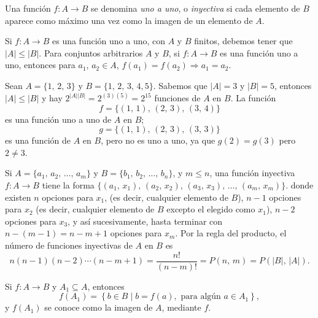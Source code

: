 \begin{definicion}{}{}
     Una función $f: A \longrightarrow B$ se denomina \textit{uno a uno}, o \textit{inyectiva} si cada elemento de $B$ aparece como máximo una vez como la imagen de un elemento de $A$.
 \end{definicion}

 \begin{BOX}
     Si $f: A \longrightarrow B$ es una función uno a uno, con $A$ y $B$ finitos, debemos tener que $| A | \leq | B |$. Para conjuntos arbitrarios $A$ y $B$, si $f: A \longrightarrow B$ es una función uno a uno, entonces para $a_1$, $a_2 \in A$, $f(a_1) = f(a_2) \Longrightarrow a_1 = a_2$.
 \end{BOX}

 \begin{myexample}
     Sean $A = \{1, \, 2, \, 3\}$ y $B = \{1, \, 2, \, 3, \, 4, 5\}$. Sabemos que $|A| = 3$ y $|B| = 5$, entonces $|A| \leq |B|$ y hay $2^{|A||B|} = 2^{(3)(5)} = 2^{15}$ funciones de $A$ en $B$. La función
     $$f=\{(1, \, 1), \, (2, \, 3), \, (3, \, 4)\}$$
     es una función uno a uno de $A$ en $B$;
     $$g=\{(1, \, 1), \, (2, \, 3), \, (3, \, 3)\}$$
     es una función de $A$ en $B$, pero no es uno a uno, ya que $g(2) = g(3)$ pero $2 \neq 3$.
 \end{myexample}

 \newpage

\begin{BOX}
     Si $A = \{a_1, \, a_2, \, \dots, \, a_m \}$ y $B = \{b_1, \, b_2, \, \dots, \, b_n \}$, y $m \leq n$, una función inyectiva $f: A \longrightarrow B$ tiene la forma $\{(a_1, \, x_1), \, (a_2, \, x_2), \, (a_3, \, x_3), \, \dots, \, (a_m, \, x_m)\}$. donde existen $n$ opciones para $x_1$, (es decir, cualquier elemento de $B$), $n - 1$ opciones para $x_2$ (es decir, cualquier elemento de $B$ excepto el elegido como $x_1$), $n- 2$ opciones para $x_3$, y así sucesivamente, hasta terminar con $n - (m- 1) =n - m + 1$ opciones para $x_m$. Por la regla del producto, el número de funciones inyectivas de $A$ en $B$ es
     $$n(n-1)(n-2) \cdots (n-m+1) = \frac{n!}{(n-m)!} = P(n, \, m) = P(|B|, \, |A|).$$
\end{BOX}

\begin{definicion}{}{}
    Si $f: A \longrightarrow B$ y $A_1 \subseteq A$, entonces
    $$f(A_1) = \left\{b \in B \mid b = f(a), \text{ para algún } a \in A_1 \right\},$$
    y $f(A_1)$ se conoce como la imagen de $A$, mediante $f$.
\end{definicion}

